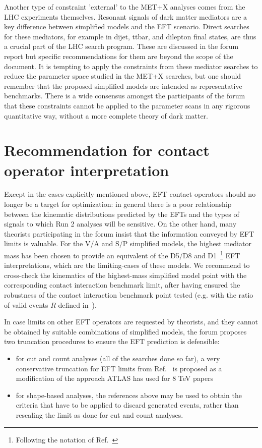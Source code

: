 \documentclass[a4,debug,notitlepage,nobib]{tufte-handout}
\begin{document}
Another type of constraint 'external' to the MET+X analyses comes from
the LHC experiments themselves. Resonant signals of dark matter
mediators are a key difference between simplified models and the EFT
scenario. Direct searches for these mediators, for example in dijet,
ttbar, and dilepton final states, are thus a crucial part of the LHC
search program. These are discussed in the forum report but specific
recommendations for them are beyond the scope of the document.  It is
tempting to apply the constraints from these mediator searches to
reduce the parameter space studied in the MET+X searches, but one
should remember that the proposed simplified models are intended as
representative benchmarks. There is a wide consensus amongst the
participants of the forum that these constraints cannot be applied to
the parameter scans in any rigorous quantitative way, without a more
complete theory of dark matter.

\section{Recommendation for contact operator interpretation}
\label{sec:eft}

Except in the cases explicitly mentioned above, EFT contact operators
should no longer be a target for optimization: in general there is a
poor relationship between the kinematic distributions predicted by the
EFTs and the types of signals to which Run 2 analyses will be
sensitive. On the other hand, many theorists participating in the
forum insist that the information conveyed by EFT limits is
valuable. %
For the V/A and S/P simplified models, the highest mediator mass has
been chosen to provide an equivalent of the D5/D8 and D1~\footnote{Following 
the notation of Ref.~\cite{Goodman:2010ku}} EFT interpretations, 
which are the limiting-cases of these models. 
We recommend to cross-check the kinematics of the highest-mass simplified model point 
with the corresponding contact interaction benchmark limit, after having ensured 
the robustness of the contact interaction benchmark point tested (e.g. with the ratio 
of valid events $R$ defined in~\cite{Aad:2015zva}). 

In case limits on other EFT operators are requested by theorists, and they
cannot be obtained by suitable combinations of simplified models, the
forum proposes two truncation procedures to ensure the EFT prediction
is defensible:

\begin{itemize}
\item for cut and count analyses (all of the searches done so far), a very conservative truncation for EFT 
limits from Ref.~\cite{Racco:2015dxa} is proposed as a modification of the approach 
ATLAS has used for 8 TeV papers~\cite{Aad:2015zva}
\item for shape-based analyses, the references above may be used to obtain the criteria that 
have to be applied to discard generated events, rather than rescaling the limit as done
for cut and count analyses. 
\end{itemize}
\end{document}
